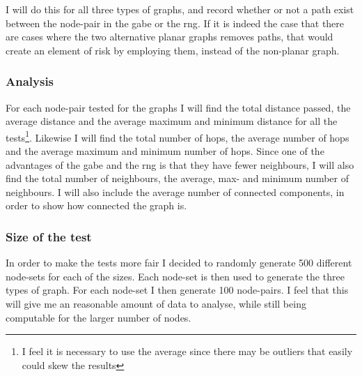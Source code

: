 I will do this for all three types of graphs, and record whether or not a path exist between the node-pair in the \ac{gabe} or the \ac{rng}. If it is indeed the case that there are cases where the two alternative planar graphs removes paths, that would create an element of risk by employing them, instead of the non-planar graph.

\subsubsection{Analysis}

For each node-pair tested for the graphs I will find the total distance passed, the average distance and the average maximum and minimum distance for all the tests\footnote{I feel it is necessary to use the average since there may be outliers that easily could skew the results}. Likewise I will find the total number of hops, the average number of hops and the average maximum and minimum number of hops. Since one of the advantages of the \ac{gabe} and the \ac{rng} is that they have fewer neighbours, I will also find the total number of neighbours, the average, max- and minimum number of neighbours. I will also include the average number of connected components, in order to show how connected the graph is.

\subsubsection{Size of the test}
In order to make the tests more fair I decided to randomly generate 500 different node-sets for each of the sizes. Each node-set is then used to generate the three types of graph. For each node-set I then generate 100 node-pairs. I feel that this will give me an reasonable amount of data to analyse, while still being computable for the larger number of nodes.

